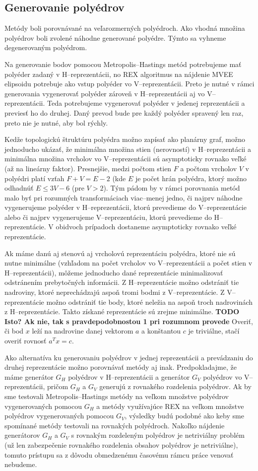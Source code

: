 \subsection{Generovanie polyédrov}
Metódy boli porovnávané na veľarozmerných polyédroch. 
Ako vhodná množina polyédrov boli zvolené náhodne generované polyédre. Týmto sa vyhneme degenerovaným polyédrom.

Na generovanie bodov pomocou Metropolis--Hastings metód potrebujeme mať polyéder zadaný v H--reprezentácii, no REX algoritmus na nájdenie MVEE elipsoidu potrebuje ako vstup polyéder vo V--reprezentácii. Preto je nutné v rámci generovania vygenerovať polyéder zároveň v H--reprezentácii aj vo V--reprezentácii. Teda potrebujeme vygenerovať polyéder v jedenej reprezentácii a previesť ho do druhej. Daný prevod bude pre každý polyéder spravený len raz, preto nie je nutné, aby bol rýchly.

Kedže topologickú štruktúru polyédra možno zapísať ako planárny graf, možno jednoducho ukázať, že minimálna množina stien (nerovností) v H--reprezentácii a minimálna množina vrcholov vo V--reprezentácii sú asymptoticky rovnako veľké (až na lineárny faktor).
Presnejšie, medzi počtom stien $F$ a počtom vrcholov $V$ v polyédri platí vzťah $F+V=E-2$ (kde $E$ je počet hrán polyédra, ktorý možno odhadnúť $E \le 3V-6$ (pre $V>2$).
Tým pádom by v rámci porovnania metód malo byť pri rozumných transformáciach viac--menej jedno, či najprv náhodne vygenerujeme polyéder v H--reprezentácii, ktorú prevedieme do V--reprezentácie alebo či najprv vygenerujeme V--reprezentáciu, ktorú prevedieme do H--reprezentácie. V obidvoch prípadoch dostaneme asymptoticky rovnako veľké reprezentácie.

Ak máme danú aj stenovú aj vrcholovú reprezentáciu polyédra, ktoré nie sú nutne minimálne (vzhľadom na počet vrcholov vo V--reprezentácii a počet stien v H--reprezentácii), môžeme jednoducho dané reprezentácie minimalizovať odstránením prebytočných informácii. Z H--reprezentácie možno odstrániť tie nadroviny, ktoré neprechádzajú aspoň tromi bodmi z V--reprezentácie. Z V--reprezentácie možno odstrániť tie body, ktoré neležia na aspoň troch nadrovinách z H--reprezentácie. Takto získané reprezentácie sú zrejme minimálne. \textbf{TODO Isto? Ak nie, tak s pravdepodobnostou 1 pri rozumnom provede}
Overiť, či bod $x$ leží na nadrovine danej vektorom $a$ a konštantou $c$ je triviálne, stačí overiť rovnosť $a^Tx=c$.

Ako alternatíva ku generovaniu polyédrov v jednej reprezentácii a prevádzaniu do druhej reprezentácie možno porovnávať metódy aj inak. 
Predpokladajme, že máme generátor $G_H$ polyédrov v H--reprezentácii a generátor $G_V$ polyédrov vo V--reprezentácii, pričom $G_H$ a $G_V$ generujú z rovnakého rozdelenia polyédrov.
Ak by sme testovali Metropolis--Hastings metódy na veľkom množstve polyédrov vygenerovaných pomocou $G_H$ a metódy využívajúce REX na veľkom množstve polyédrov vygenerovaných pomocou $G_V$, výsledky budú podobné ako keby sme spomínané metódy testovali na rovnakých polyédroch.
Nakoľko nájdenie generátorov $G_H$ a $G_V$ s rovnakým rozdeleným polyédrov je netriviálny problém (už len zabezpečenie rovnakého rozdelenia obsahov polyédrov je netriviálne), tomuto prístupu sa z dôvodu obmedzenému časovému rámcu práce venovať nebudeme.

